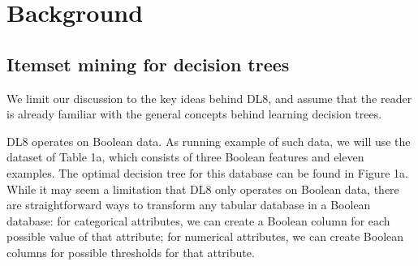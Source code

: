 \section{Background}
\subsection{Itemset mining for decision trees}
We limit our discussion to the key ideas behind DL8, and assume that the reader is already familiar with the general concepts behind learning decision trees.

DL8 operates on Boolean data. As running example of such data, we will use the dataset of Table 1a, which consists of three Boolean features and eleven examples. The optimal decision tree for this database can be found in Figure 1a. While it may seem a limitation that DL8 only operates on Boolean data, there are straightforward ways to transform any tabular database in a Boolean database: for categorical attributes, we can create a Boolean column for each possible value of that attribute; for numerical attributes, we can create Boolean columns for possible thresholds for that attribute.

